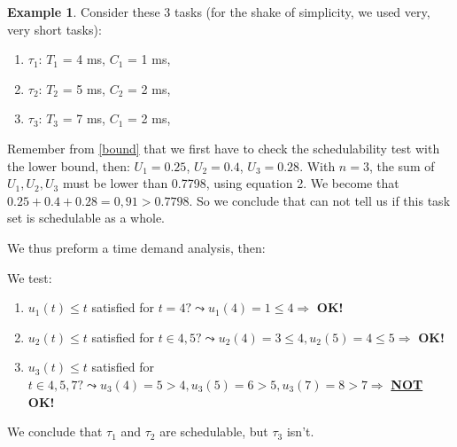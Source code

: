 \documentclass[a4paper,12pt]{article}
\theoremstyle{definition}
\newtheorem{example}[theorem]{Example}
\begin{document}
\begin{example}\label{goei}
  Consider these 3 tasks (for the shake of simplicity, we used very, very short tasks):
  \begin{enumerate}
    \item $\tau_1$: $T_1$ = 4 ms,  $C_1$ = 1 ms,
    \item $\tau_2$: $T_2$ = 5 ms,  $C_2$ = 2 ms,
    \item  $\tau_3$: $T_3$ = 7 ms,   $C_1$ = 2 ms,
  \end{enumerate}
  Remember from \ref{bound} that we first have to check the schedulability 
  test with the lower bound, then: $U_1 = 0.25$, $U_2 = 0.4$, $U_3 = 0.28$. With $n=3$, the sum of $U_1, U_2, U_3$ must be lower than 0.7798, using equation 2.  We become that 
  $0.25 + 0.4 + 0.28 = 0, 91 > 0.7798$. So we conclude that  can not tell us if 
  this task set is schedulable as a whole. 
  
  We thus preform a time demand analysis, then:
 \begin{enumerate}
  \item $u_1(t) = C_1 = 1$
    \item $u_2(t) = C_2 +  \left \lceil{\frac{t}{T_1}\right \rceil C_1 = 2 + \left \lceil{\frac{t}{4}\right 
    \rceil*1$
  \item $u_3(t) = C_3 +  \left \lceil{\frac{t}{T_1}\right \rceil C_1 +  \left \lceil{\frac{t}{T_2}\right \rceil C_2 = 2 + \left \lceil{\frac{t}{4}\right \rceil*1 
  + \left \lceil{\frac{t}{5}\right \rceil*2$
  \end{enumerate}
  We test:
  \begin{enumerate}
  \item $u_1(t) \leq t$ satisfied for $t=4? \leadsto u_1(4) = 1 \leq 4 \Rightarrow$ \textbf{OK!}
  \item $u_2(t) \leq t$ satisfied for $t\in{4,5}? \leadsto u_2(4) = 3 \leq 4,  u_2(5) = 4 \leq 5 \Rightarrow$ \textbf{OK!}
  \item $u_3(t) \leq t$ satisfied for $t\in{4,5,7}? \leadsto u_3(4) = 5 > 4,  u_3(5) = 6 > 5, u_3(7) = 8 > 7 \Rightarrow$ \textbf{\underline{NOT} OK!}
\end{enumerate}
  We conclude that $\tau_1$ and $\tau_2$ are schedulable, but $\tau_3$ isn't.
  \end{example}
  
\end{document}
